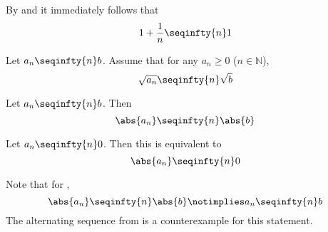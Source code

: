 \begin{exm}\label{exm-sequence-arithmetic:1}
	By  and 
	it immediately follows that
	\begin{equation*}
		1+\frac{1}{n} \seqinfty{n} 1
	\end{equation*}
\end{exm}

\begin{thm}\label{thm-sequence-sqrt-limit}
	Let $a_n \seqinfty{n} b$. Assume that for any $a_n\geq0$ ($n\in\mathbb{N}$),
	\begin{equation*}
		\sqrt{a_n} \seqinfty{n} \sqrt{b}
	\end{equation*}
\end{thm}

\begin{thm}\label{thm-sequence-abs}
	Let $a_n \seqinfty{n} b$. Then
	\begin{equation*}
		\abs{a_n} \seqinfty{n} \abs{b}
	\end{equation*}
\end{thm}

\begin{thm}\label{thm-sequence-zero-limit}
	Let $a_n \seqinfty{n} 0$. Then this is equivalent to
	\begin{equation*}
		\abs{a_n} \seqinfty{n} 0
	\end{equation*}
\end{thm}

\begin{rem}\label{rem-sequence-abs}
	Note that for ,
	\begin{equation*}
		\abs{a_n} \seqinfty{n} \abs{b} \notimplies a_n \seqinfty{n} b
	\end{equation*}
	The alternating sequence from  is a
	counterexample for this statement.
\end{rem}

